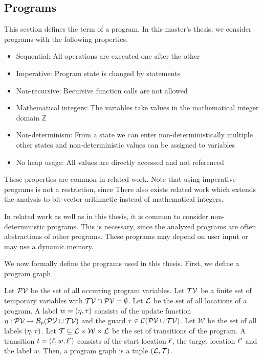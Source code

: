 \subsection{Programs}

This section defines the term of a program.
In this master's thesis, we consider programs with the following properties.

\begin{itemize}
\item Sequential: All operations are executed one after the other
\item Imperative: Program state is changed by statements
\item Non-recursive: Recursive function calls are not allowed
\item Mathematical integers: The variables take values in the mathematical integer domain $\mathbb{Z}$
\item Non-determinism: From a state we can enter non-deterministically multiple other states and non-deterministic values can be assigned to variables
\item No heap usage: All values are directly accessed and not referenced
\end{itemize}

These properties are common in related work.
Note that using imperative programs is not a restriction, since 
There also exists related work which extends the analysis to bit-vector arithmetic instead of mathematical integers. \cite{bitvectorarithmetic}

In related work as well as in this thesis, it is common to consider non-deterministic programs.
This is necessary, since the analyzed programs are often abstractions of other programs.
These programs may depend on user input or may use a dynamic memory.


We now formally define the programs used in this thesis.
First, we define a program graph.

\begin{definition} 
  Let $\mathcal{PV}$ be the set of all occurring program variables.
  Let $\mathcal{TV}$ be a finite set of temporary variables with $\mathcal{TV} \cap \mathcal{PV} = \emptyset$.
  Let $\mathcal{L}$ be the set of all locations of a program.
  A label $w = (\eta, \tau)$ consists of the update function $\eta: \mathcal{PV} \rightarrow \mathcal{B}_p(\mathcal{PV} \cup \mathcal{TV})$ and the guard $\tau \in \mathcal{C}(\mathcal{PV} \cup \mathcal{TV})$.
  Let $\mathcal{W}$ be the set of all labels $(\eta, \tau)$.
  Let $\mathcal{T} \subseteq \mathcal{L} \times \mathcal{W} \times \mathcal{L}$ be the set of transitions of the program.
  A transition $t = (\ell, w, \ell')$ consists of the start location $\ell$, the target location $\ell'$ and the label $w$.
  Then, a program graph is a tuple $(\mathcal{L}, \mathcal{T})$.
\end{definition}

